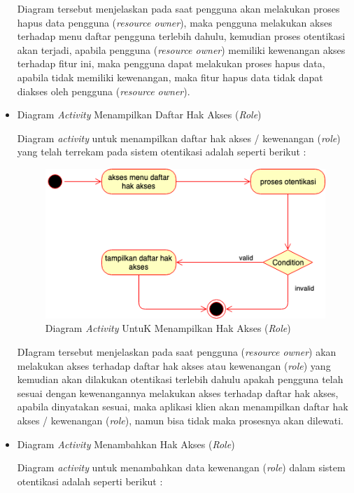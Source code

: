 \documentclass[pdftex,12pt, oneside]{article}
\begin{document}
\begin{itemize}
	Diagram tersebut menjelaskan pada saat pengguna akan melakukan proses hapus data pengguna (\textit{resource owner}), maka pengguna melakukan akses terhadap menu daftar pengguna terlebih dahulu, kemudian proses otentikasi akan terjadi, apabila pengguna (\textit{resource owner}) memiliki kewenangan akses terhadap fitur ini, maka pengguna dapat melakukan proses hapus data, apabila tidak memiliki kewenangan, maka fitur hapus data tidak dapat diakses oleh pengguna (\textit{resource owner}).
	
	\item Diagram \textit{Activity} Menampilkan Daftar Hak Akses (\textit{Role})
	
	Diagram \textit{activity} untuk menampilkan daftar hak akses / kewenangan (\textit{role}) yang telah terrekam pada sistem otentikasi adalah seperti berikut :
	
	\begin{figure}[H]
		\centering
		\includegraphics[width=1\textwidth]{./resources/act-dia-list-role}
		\caption{Diagram \textit{Activity} UntuK Menampilkan Hak Akses (\textit{Role})}
		\label{fig:act-dia-list-role}
	\end{figure}
	
	DIagram tersebut menjelaskan pada saat pengguna (\textit{resource owner}) akan melakukan akses terhadap daftar hak akses atau kewenangan (\textit{role}) yang kemudian akan dilakukan otentikasi terlebih dahulu apakah pengguna telah sesuai dengan kewenangannya melakukan akses terhadap daftar hak akses, apabila dinyatakan sesuai, maka aplikasi klien akan menampilkan daftar hak akses / kewenangan (\textit{role}), namun bisa tidak maka prosesnya akan dilewati.
	
	\item Diagram \textit{Activity} Menambahkan Hak Akses (\textit{Role})
	
	Diagram \textit{activity} untuk menambahkan data kewenangan (\textit{role}) dalam sistem otentikasi adalah seperti berikut :
	

\end{itemize}
\end{document}
